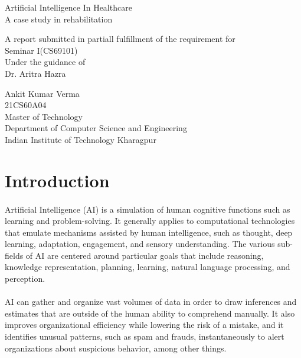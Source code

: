 \documentclass[12pt]{article}
\begin{document}
	
\begin{titlepage}
	\begin{center}
		\huge
		Artificial Intelligence In Healthcare\\
		\vspace{0.2cm}
		\normalsize
		A case study in rehabilitation
		
		\vspace{1.5cm}
		\large
		A report submitted in partiall fulfillment of the requirement for \\Seminar I(CS69101)\\
		
		\vspace{4.5cm}
		Under the guidance of\\
		Dr. Aritra Hazra
		
		\vfill

		\Large
		Ankit Kumar Verma\\
		\normalsize
		21CS60A04\\
		Master of Technology\\
		Department of Computer Science and Engineering\\
		Indian Institute of Technology Kharagpur\\
	\end{center}
\end{titlepage}

\tableofcontents
\newpage

\section{Introduction}
\paragraph{}
Artificial Intelligence (AI) is a simulation of human cognitive functions such as learning and problem-solving. It generally applies to computational technologies that emulate mechanisms assisted by human intelligence, such as thought, deep learning, adaptation, engagement, and sensory understanding.\cite{Silvana Secinaro} The various sub-fields of AI are centered around particular goals that include reasoning, knowledge representation, planning, learning, natural language processing, and perception.\cite{AI}

\paragraph{}
AI can gather and organize vast volumes of data in order to draw inferences and estimates that are outside of the human ability to comprehend manually. It also improves organizational efficiency while lowering the risk of a mistake, and it identifies unusual patterns, such as spam and frauds, instantaneously to alert organizations about suspicious behavior, among other things.\cite{Madhurjya Chowdhury}
\end{document}
